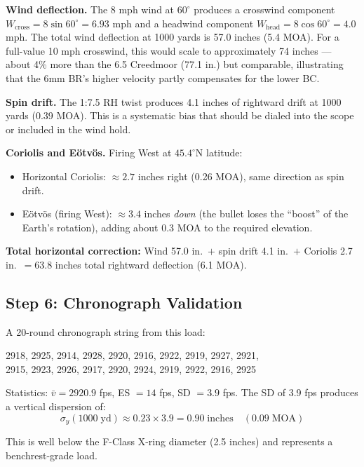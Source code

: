 \documentclass[11pt,twoside,openright]{report}
\begin{document}
\textbf{Wind deflection.} The 8 mph wind at $60^{\circ}$ produces a crosswind component $W_{\mathrm{cross}} = 8 \sin 60^{\circ} = 6.93$ mph and a headwind component $W_{\mathrm{head}} = 8 \cos 60^{\circ} = 4.0$ mph. The total wind deflection at 1000 yards is 57.0 inches (5.4 MOA). For a full-value 10 mph crosswind, this would scale to approximately 74 inches --- about 4\% more than the 6.5 Creedmoor (77.1 in.) but comparable, illustrating that the 6mm BR's higher velocity partly compensates for the lower BC.

\textbf{Spin drift.} The 1:7.5 RH twist produces 4.1 inches of rightward drift at 1000 yards (0.39 MOA). This is a systematic bias that should be dialed into the scope or included in the wind hold.

\textbf{Coriolis and E\"otv\"os.} Firing West at $45.4^{\circ}$N latitude:
\begin{itemize}[nosep]
  \item Horizontal Coriolis: $\approx 2.7$ inches right (0.26 MOA), same direction as spin drift.
  \item E\"otv\"os (firing West): $\approx 3.4$ inches \emph{down} (the bullet loses the ``boost'' of the Earth's rotation), adding about 0.3 MOA to the required elevation.
\end{itemize}

\textbf{Total horizontal correction:} Wind 57.0 in.\ $+$ spin drift 4.1 in.\ $+$ Coriolis 2.7 in.\ $= 63.8$ inches total rightward deflection (6.1 MOA).

\subsection{Step 6: Chronograph Validation}

A 20-round chronograph string from this load:
\begin{center}
\small
2918, 2925, 2914, 2928, 2920, 2916, 2922, 2919, 2927, 2921, \\
2915, 2923, 2926, 2917, 2920, 2924, 2919, 2922, 2916, 2925
\end{center}

Statistics: $\bar{v} = 2920.9$ fps, ES $= 14$ fps, SD $= 3.9$ fps. The SD of 3.9 fps produces a vertical dispersion of:
\begin{equation*}
  \sigma_y(1000\;\text{yd}) \approx 0.23 \times 3.9 = 0.90\;\text{inches} \quad (0.09\;\text{MOA})
\end{equation*}

This is well below the F-Class X-ring diameter (2.5 inches) and represents a benchrest-grade load.
\end{document}

